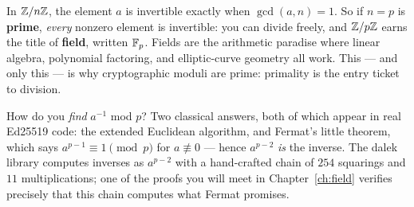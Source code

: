 \begin{bigidea}
In $\mathbb{Z}/n\mathbb{Z}$, the element $a$ is invertible exactly when
$\gcd(a, n) = 1$. So if $n = p$ is \textbf{prime}, \emph{every} nonzero
element is invertible: you can divide freely, and $\mathbb{Z}/p\mathbb{Z}$ earns the title
of \textbf{field}, written $\mathbb{F}_p$. Fields are the arithmetic paradise where
linear algebra, polynomial factoring, and elliptic-curve geometry all work.
This --- and only this --- is why cryptographic moduli are prime: primality
is the entry ticket to division.
\end{bigidea}

\begin{center}
\end{center}

How do you \emph{find} $a^{-1}$ mod $p$? Two classical answers, both of which
appear in real Ed25519 code: the extended Euclidean algorithm, and Fermat's
little theorem, which says $a^{p-1} \equiv 1 \pmod p$ for $a \not\equiv 0$
--- hence $a^{p-2}$ \emph{is} the inverse. The dalek library computes
inverses as $a^{p-2}$ with a hand-crafted chain of $254$ squarings and $11$
multiplications; one of the proofs you will meet in Chapter~\ref{ch:field}
verifies precisely that this chain computes what Fermat promises.

